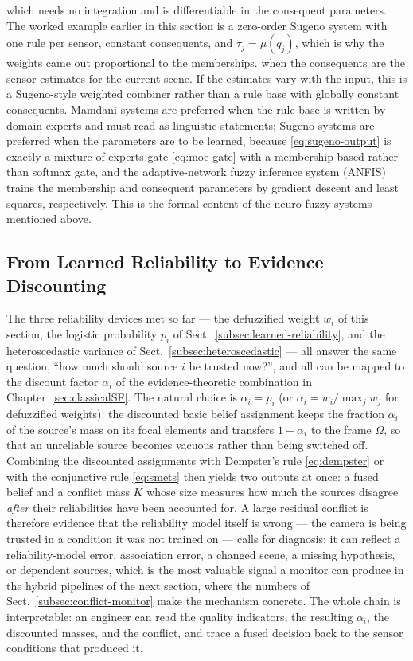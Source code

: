\documentclass[graybox,envcountchap]{style/SNmono}
\providecommand{\DIFadd}[1]{{\protect\color{blue} #1}} %
\providecommand{\DIFdel}[1]{{\protect\color{red} #1}} %
\providecommand{\DIFaddbegin}{} %
\providecommand{\DIFaddend}{} %
\providecommand{\DIFdelbegin}{} %
\providecommand{\DIFdelend}{} %
\begin{document}
which needs no integration and is differentiable in the consequent parameters. The worked example earlier in this section is a zero-order Sugeno system with one rule per sensor, constant consequents, and $\tau_j=\mu(q_j)$, \DIFdelbegin \DIFdel{which is why the weights came out proportional to the memberships. }\DIFdelend \DIFaddbegin \DIFadd{when the consequents are the sensor estimates for the current scene. If the estimates vary with the input, this is a Sugeno-style weighted combiner rather than a rule base with globally constant consequents. }\DIFaddend Mamdani systems are preferred when the rule base is written by domain experts and must read as linguistic statements; Sugeno systems are preferred when the parameters are to be learned, because \eqref{eq:sugeno-output} is exactly a mixture-of-experts gate \eqref{eq:moe-gate} with a membership-based rather than softmax gate, and the adaptive-network fuzzy inference system (ANFIS) \cite{jang1993_anfis} trains the membership and consequent parameters by gradient descent and least squares, respectively. This is the formal content of the neuro-fuzzy systems mentioned above.

\subsection{From Learned Reliability to Evidence Discounting}
\label{subsec:reliability-to-discounting}
The three reliability devices met so far --- the defuzzified weight $w_i$ of this section, the logistic probability $p_i$ of Sect.~\ref{subsec:learned-reliability}, and the heteroscedastic variance of Sect.~\ref{subsec:heteroscedastic} --- all answer the same question, ``how much should source $i$ be trusted now?'', and all can be mapped to the discount factor $\alpha_i$ of the evidence-theoretic combination in Chapter~\ref{sec:classicalSF}. The natural choice is $\alpha_i=p_i$ (or $\alpha_i=w_i/\max_j w_j$ for defuzzified weights): the discounted basic belief assignment keeps the fraction $\alpha_i$ of the source's mass on its focal elements and transfers $1-\alpha_i$ to the frame $\Omega$, so that an unreliable source becomes vacuous rather than being switched off. Combining the discounted assignments with Dempster's rule \eqref{eq:dempster} or with the conjunctive rule \eqref{eq:smets} then yields two outputs at once: a fused belief and a conflict mass $K$ whose size measures how much the sources disagree \emph{after} their reliabilities have been accounted for. A large residual conflict \DIFdelbegin \DIFdel{is therefore evidence that the reliability model itself is wrong --- the camera is being trusted in a condition it was not trained on --- }\DIFdelend \DIFaddbegin \DIFadd{calls for diagnosis: it can reflect a reliability-model error, association error, a changed scene, a missing hypothesis, or dependent sources, }\DIFaddend which is the most valuable signal a monitor can produce in the hybrid pipelines of the next section, where the numbers of Sect.~\ref{subsec:conflict-monitor} make the mechanism concrete. The whole chain is interpretable: an engineer can read the quality indicators, the resulting $\alpha_i$, the discounted masses, and the conflict, and trace a fused decision back to the sensor conditions that produced it.
\end{document}
